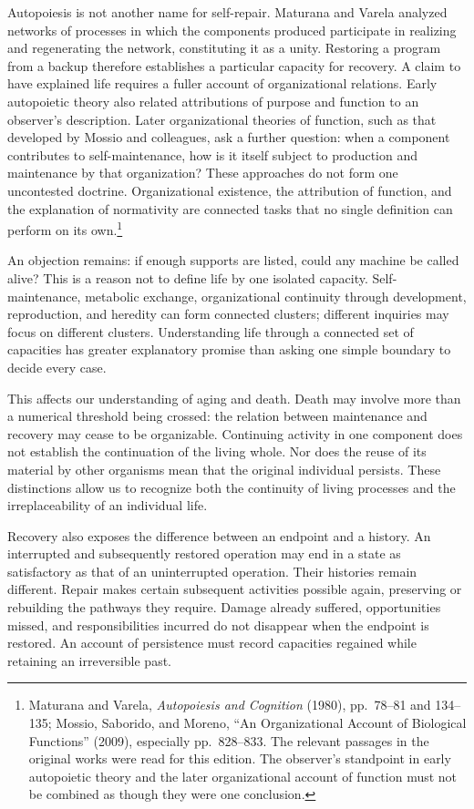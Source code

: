 \documentclass[
  english,
  11pt,
  oneside]{book}
\begin{document}
Autopoiesis is not another name for self-repair. Maturana and Varela analyzed networks of processes in which the components produced participate in realizing and regenerating the network, constituting it as a unity. Restoring a program from a backup therefore establishes a particular capacity for recovery. A claim to have explained life requires a fuller account of organizational relations. Early autopoietic theory also related attributions of purpose and function to an observer's description. Later organizational theories of function, such as that developed by Mossio and colleagues, ask a further question: when a component contributes to self-maintenance, how is it itself subject to production and maintenance by that organization? These approaches do not form one uncontested doctrine. Organizational existence, the attribution of function, and the explanation of normativity are connected tasks that no single definition can perform on its own.\footnote{\hypertarget{ph-note-17}{}Maturana and Varela, \emph{Autopoiesis and Cognition} (1980), pp.~78--81 and 134--135; Mossio, Saborido, and Moreno, ``An Organizational Account of Biological Functions'' (2009), especially pp.~828--833. The relevant passages in the original works were read for this edition. The observer's standpoint in early autopoietic theory and the later organizational account of function must not be combined as though they were one conclusion.}

An objection remains: if enough supports are listed, could any machine be called alive? This is a reason not to define life by one isolated capacity. Self-maintenance, metabolic exchange, organizational continuity through development, reproduction, and heredity can form connected clusters; different inquiries may focus on different clusters. Understanding life through a connected set of capacities has greater explanatory promise than asking one simple boundary to decide every case.

This affects our understanding of aging and death. Death may involve more than a numerical threshold being crossed: the relation between maintenance and recovery may cease to be organizable. Continuing activity in one component does not establish the continuation of the living whole. Nor does the reuse of its material by other organisms mean that the original individual persists. These distinctions allow us to recognize both the continuity of living processes and the irreplaceability of an individual life.

Recovery also exposes the difference between an endpoint and a history. An interrupted and subsequently restored operation may end in a state as satisfactory as that of an uninterrupted operation. Their histories remain different. Repair makes certain subsequent activities possible again, preserving or rebuilding the pathways they require. Damage already suffered, opportunities missed, and responsibilities incurred do not disappear when the endpoint is restored. An account of persistence must record capacities regained while retaining an irreversible past.
\end{document}
